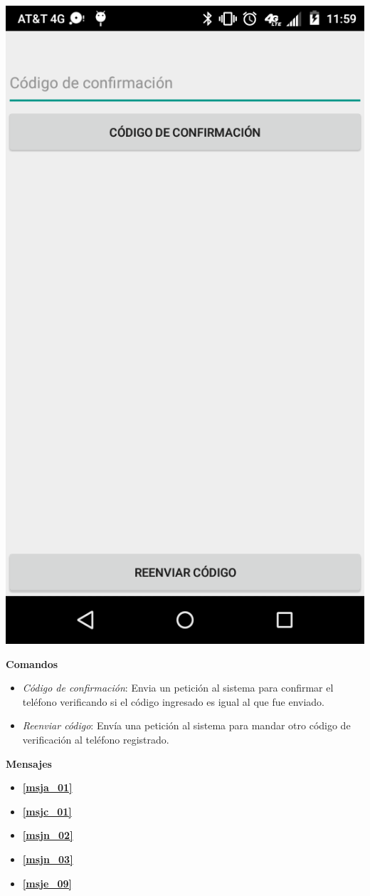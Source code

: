     \begin{center}
      \includegraphics[scale=.2]{Capitulo3/img/gui/IU_Confirmar_telefono.png}
      \label{fig:iu06_fig}
    \end{center}
  \textbf{Comandos}
    \begin{itemize}
      \item \textit{Código de confirmación}: Envia un petición al sistema para confirmar el teléfono verificando si el código ingresado es igual al que fue enviado.
      \item \textit{Reenviar código}: Envía una petición al sistema para mandar otro código de verificación al teléfono registrado.
    \end{itemize}
\textbf{Mensajes}
  \begin{itemize}
    \item \textbf{\ref{msja_01}}
    \item \textbf{\ref{msjc_01}}
    \item \textbf{\ref{msjn_02}}
    \item \textbf{\ref{msjn_03}}
    \item \textbf{\ref{msje_09}}
  \end{itemize}